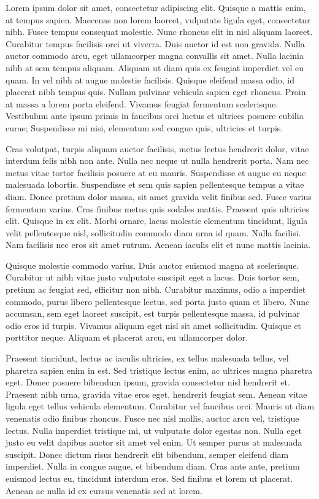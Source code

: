 Lorem ipsum dolor sit amet, consectetur adipiscing elit. Quisque a mattis enim, at tempus sapien. Maecenas non lorem laoreet, vulputate ligula eget, consectetur nibh. Fusce tempus consequat molestie. Nunc rhoncus elit in nisl aliquam laoreet. Curabitur tempus facilisis orci ut viverra. Duis auctor id est non gravida. Nulla auctor commodo arcu, eget ullamcorper magna convallis sit amet. Nulla lacinia nibh at sem tempus aliquam. Aliquam ut diam quis ex feugiat imperdiet vel eu quam. In vel nibh at augue molestie facilisis. Quisque eleifend massa odio, id placerat nibh tempus quis. Nullam pulvinar vehicula sapien eget rhoncus. Proin at massa a lorem porta eleifend. Vivamus feugiat fermentum scelerisque. Vestibulum ante ipsum primis in faucibus orci luctus et ultrices posuere cubilia curae; Suspendisse mi nisi, elementum sed congue quis, ultricies et turpis.

Cras volutpat, turpis aliquam auctor facilisis, metus lectus hendrerit dolor, vitae interdum felis nibh non ante. Nulla nec neque ut nulla hendrerit porta. Nam nec metus vitae tortor facilisis posuere at eu mauris. Suspendisse et augue eu neque malesuada lobortis. Suspendisse et sem quis sapien pellentesque tempus a vitae diam. Donec pretium dolor massa, sit amet gravida velit finibus sed. Fusce varius fermentum varius. Cras finibus metus quis sodales mattis. Praesent quis ultricies elit. Quisque in ex elit. Morbi ornare, lacus molestie elementum tincidunt, ligula velit pellentesque nisl, sollicitudin commodo diam urna id quam. Nulla facilisi. Nam facilisis nec eros sit amet rutrum. Aenean iaculis elit et nunc mattis lacinia.

Quisque molestie commodo varius. Duis auctor euismod magna at scelerisque. Curabitur ut nibh vitae justo vulputate suscipit eget a lacus. Duis tortor sem, pretium ac feugiat sed, efficitur non nibh. Curabitur maximus, odio a imperdiet commodo, purus libero pellentesque lectus, sed porta justo quam et libero. Nunc accumsan, sem eget laoreet suscipit, est turpis pellentesque massa, id pulvinar odio eros id turpis. Vivamus aliquam eget nisl sit amet sollicitudin. Quisque et porttitor neque. Aliquam et placerat arcu, eu ullamcorper dolor.

Praesent tincidunt, lectus ac iaculis ultricies, ex tellus malesuada tellus, vel pharetra sapien enim in est. Sed tristique lectus enim, ac ultrices magna pharetra eget. Donec posuere bibendum ipsum, gravida consectetur nisl hendrerit et. Praesent nibh urna, gravida vitae eros eget, hendrerit feugiat sem. Aenean vitae ligula eget tellus vehicula elementum. Curabitur vel faucibus orci. Mauris ut diam venenatis odio finibus rhoncus. Fusce nec nisl mollis, auctor arcu vel, tristique lectus. Nulla imperdiet tristique mi, ut vulputate dolor egestas non. Nulla eget justo eu velit dapibus auctor sit amet vel enim. Ut semper purus at malesuada suscipit. Donec dictum risus hendrerit elit bibendum, semper eleifend diam imperdiet. Nulla in congue augue, et bibendum diam. Cras ante ante, pretium euismod lectus eu, tincidunt interdum eros. Sed finibus et lorem ut placerat. Aenean ac nulla id ex cursus venenatis sed at lorem.

